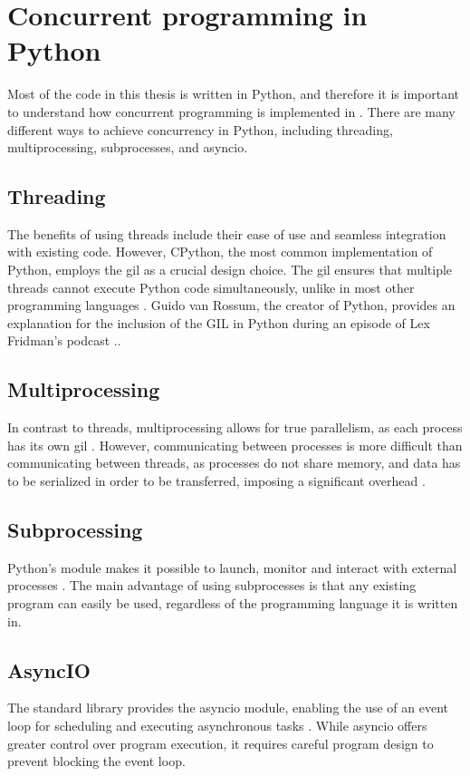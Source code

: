 \section{Concurrent programming in Python}
\label{sec:concurrent_programming_in_python}
Most of the code in this thesis is written in Python, and therefore it is important to understand how concurrent programming is implemented in \py.
There are many different ways to achieve concurrency in Python, including threading, multiprocessing, subprocesses, and \gls{asyncio}.

\subsection{Threading}
The benefits of using threads include their ease of use and seamless integration with existing code. However, CPython, the most common implementation of Python, employs the \gls{gil} as a crucial design choice. The \gls{gil} ensures that multiple threads cannot execute Python code simultaneously, unlike in most other programming languages \cite{ajitsariaWhatPythonGlobal2018}. Guido van Rossum, the creator of Python, provides an explanation for the inclusion of the GIL in Python during an episode of Lex Fridman's podcast \cite{lexfridmanGuidoVanRossum2022}..

\subsection{Multiprocessing}
In contrast to threads, multiprocessing allows for true parallelism, as each process has its own \gls{gil} \cite{ajitsariaWhatPythonGlobal2018}.
However, communicating between processes is more difficult than communicating between threads, as processes do not share memory, and data has to be serialized in order to be transferred, imposing a significant overhead \cite{pythonsoftwarefoundationMultiprocessingProcessbasedParallelism}.

\subsection{Subprocessing}
Python's  module makes it possible to launch, monitor and interact with external processes \cite{pythonsoftwarefoundationSubprocessSubprocessManagement}.
The main advantage of using subprocesses is that any existing program can easily be used, regardless of the programming language it is written in.

\subsection{AsyncIO}
The \py standard library provides the \gls{asyncio} module, enabling the use of an event loop for scheduling and executing asynchronous tasks \cite{pythonsoftwarefoundationAsyncioAsynchronous}.
While \gls{asyncio} offers greater control over program execution, it requires careful program design to prevent blocking the event loop.

